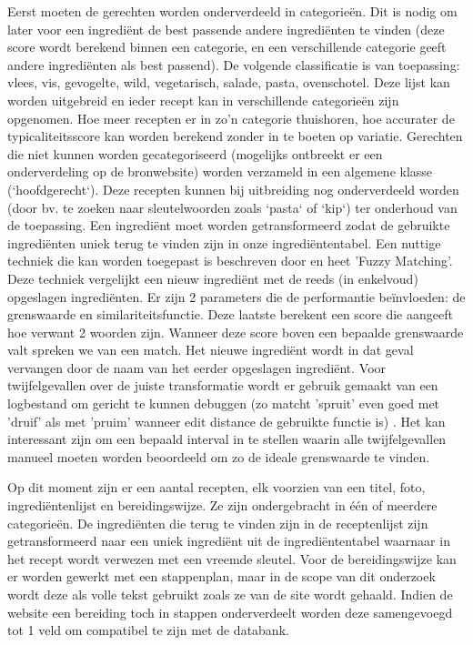 \documentclass{hogent-article}
\begin{document}
Eerst moeten de gerechten worden onderverdeeld in categorieën. Dit is nodig om later voor een ingrediënt de best passende andere ingrediënten te vinden (deze score wordt berekend binnen een categorie, en een verschillende categorie geeft andere ingrediënten als best passend). De volgende classificatie is van toepassing: vlees, vis, gevogelte, wild, vegetarisch, salade, pasta, ovenschotel. Deze lijst kan worden uitgebreid en ieder recept kan in verschillende categorieën zijn opgenomen. Hoe meer recepten er in zo'n categorie thuishoren, hoe accurater de typicaliteitsscore \autocite{Yokoi2015} kan worden berekend zonder in te boeten op variatie. Gerechten die niet kunnen worden gecategoriseerd (mogelijks ontbreekt er een onderverdeling op de bronwebsite) worden verzameld in een algemene klasse (`hoofdgerecht`). Deze recepten kunnen bij uitbreiding nog onderverdeeld worden (door bv. te zoeken naar sleutelwoorden zoals `pasta` of `kip`) ter onderhoud van de toepassing.
Een ingrediënt moet worden getransformeerd zodat de gebruikte ingrediënten uniek terug te vinden zijn in onze ingrediëntentabel. Een nuttige techniek die kan worden toegepast is beschreven door \textcite{Chaudhuri2003} en heet 'Fuzzy Matching'. Deze techniek vergelijkt een nieuw ingrediënt met de reeds (in enkelvoud) opgeslagen ingrediënten. Er zijn 2 parameters die de performantie beïnvloeden: de grenswaarde en similariteitsfunctie. Deze laatste berekent een score die aangeeft hoe verwant 2 woorden zijn. Wanneer deze score boven een bepaalde grenswaarde valt spreken we van een match. Het nieuwe ingrediënt wordt in dat geval vervangen door de naam van het eerder opgeslagen ingrediënt. Voor twijfelgevallen over de juiste transformatie wordt er gebruik gemaakt van een logbestand om gericht te kunnen debuggen (zo matcht 'spruit' even goed met 'druif' als met 'pruim' wanneer edit distance \autocite{Chaudhuri2003} de gebruikte functie is) . Het kan interessant zijn om een bepaald interval in te stellen waarin alle twijfelgevallen manueel moeten worden beoordeeld om zo de ideale grenswaarde te vinden.

Op dit moment zijn er een aantal recepten, elk voorzien van een titel, foto, ingrediëntenlijst en bereidingswijze. Ze zijn ondergebracht in één of meerdere categorieën. De ingrediënten die terug te vinden zijn in de receptenlijst zijn getransformeerd naar een uniek ingrediënt uit de ingrediëntentabel waarnaar in het recept wordt verwezen met een vreemde sleutel. Voor de bereidingswijze kan er worden gewerkt met een stappenplan, maar in de scope van dit onderzoek wordt deze als volle tekst gebruikt zoals ze van de site wordt gehaald. Indien de website een bereiding toch in stappen onderverdeelt worden deze samengevoegd tot 1 veld om compatibel te zijn met de databank.
\end{document}
